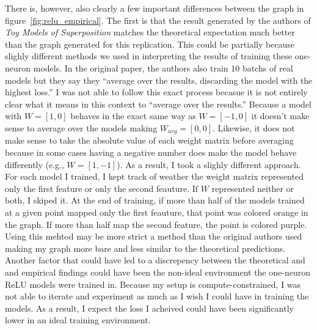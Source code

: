 \documentclass{article} %
\begin{document}
There is, however, also clearly a few important differences between the graph in
figure~\ref{fig:relu_empirical}. The first is that the result generated by the
authors of \textit{Toy Models of Superposition} matches the theoretical
expectation much better than the graph generated for this replication. This could
be partially because slighly different methods we used in interpreting the results
of training these one-neuron models. In the original paper, the authors also train
10 batchs of real models but they say they ``average over the results, discarding 
the model with the highest loss.'' I was not able to follow this exact process
becasue it is not entirely clear what it means in this context to ``average over
the results.'' Because a model with $W = [1, 0]$ behaves in the exact same way as
$W = [-1, 0]$ it doesn't make sense to average over the models making 
$W_{avg} = [0, 0]$. Likewise, it does not make sense to take the absolute value
of each weight matrix before averaging because in some cases having a negative
number does make the model behave differently (e.g., $W = [1, -1]$). As a result,
I took a slighly different approach. For each model I trained, I kept track of
weather the weight matrix represented only the first feature or only the second feauture.
If $W$ represented neither or both, I skiped it. At the end of training, if more
than half of the models trained at a given point mapped only the first feauture,
that point was colored orange in the graph. If more than half map the second feature,
the point is colored purple. Using this mehtod may be more strict a method than
the original authors used making my graph more bare and less similar to the
theoretical predictions.\\

Another factor that could have led to a discrepency between the theoretical and
and empirical findings could have been the non-ideal environment the
one-neuron ReLU models were trained in. Because my setup is compute-constrained,
I was not able to iterate and experiment as much as I wish I could have in training 
the models. As a result, I expect the loss I acheived could have been significantly
lower in an ideal training environment.




\end{document}
